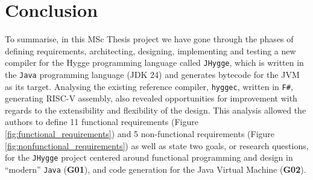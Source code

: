 \chapter{Conclusion}

To summarise, in this MSc Thesis project we have gone through the phases of defining requirements, architecting, designing, implementing
and testing a new compiler for the Hygge programming language called \texttt{JHygge}, which is written in the \texttt{Java} programming
language (JDK 24) and generates bytecode for the JVM as its target. Analysing the existing reference compiler, \texttt{hyggec}, written in
\texttt{F\#}, generating RISC-V assembly, also revealed opportunities for improvement with regards to the extensibility and flexibility
of the design. This analysis allowed the authors to define 11 functional requirements (Figure \ref{fig:functional_requirements}) and
5 non-functional requirements (Figure \ref{fig:nonfunctional_requirements}) as well as state two goals, or research questions, for
the \texttt{JHygge} project centered around functional programming and design in ``modern'' \texttt{Java} (\textbf{G01}), and code generation
for the Java Virtual Machine (\textbf{G02}).
